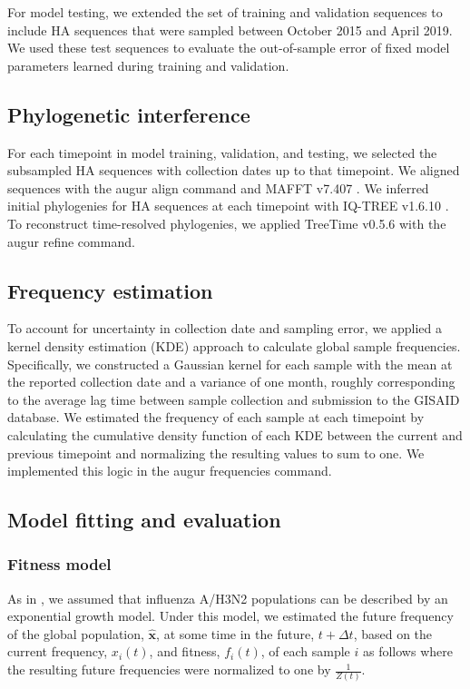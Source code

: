 For model testing, we extended the set of training and validation sequences to include HA sequences that were sampled between October 2015 and April 2019.
We used these test sequences to evaluate the out-of-sample error of fixed model parameters learned during training and validation.

\subsection*{Phylogenetic interference}

For each timepoint in model training, validation, and testing, we selected the subsampled HA sequences with collection dates up to that timepoint.
We aligned sequences with the augur align command \cite{Hadfield2018} and MAFFT v7.407 \cite{Katoh2002}.
We inferred initial phylogenies for HA sequences at each timepoint with IQ-TREE v1.6.10 \cite{Nguyen2014}.
To reconstruct time-resolved phylogenies, we applied TreeTime v0.5.6 \cite{Sagulenko2018} with the augur refine command.

\subsection*{Frequency estimation}

To account for uncertainty in collection date and sampling error, we applied a kernel density estimation (KDE) approach to calculate global sample frequencies.
Specifically, we constructed a Gaussian kernel for each sample with the mean at the reported collection date and a variance of one month, roughly corresponding to the average lag time between sample collection and submission to the GISAID database.
We estimated the frequency of each sample at each timepoint by calculating the cumulative density function of each KDE between the current and previous timepoint and normalizing the resulting values to sum to one.
We implemented this logic in the augur frequencies command.

\subsection*{Model fitting and evaluation}

\subsubsection*{Fitness model}

As in \cite{Luksza:2014hj}, we assumed that influenza A/H3N2 populations can be described by an exponential growth model.
Under this model, we estimated the future frequency of the global population, $\mathbf{\hat{x}}$, at some time in the future, $t + \Delta{t}$, based on the current frequency, $x_{i}(t)$, and fitness, $f_{i}(t)$, of each sample $i$ as follows where the resulting future frequencies were normalized to one by $\frac{1}{Z(t)}$.


